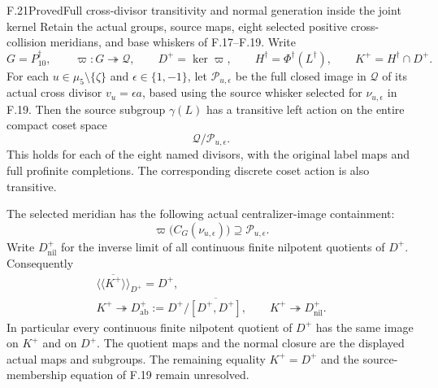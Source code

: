 \begin{claim}{F.21}{Proved}{Full cross-divisor transitivity and normal generation inside the joint kernel}
Retain the actual groups, source maps, eight selected positive
cross-collision meridians, and base whiskers of F.17--F.19.
Write
\[
 G=P_{10}^{\dagger},\qquad
 \varpi:G\twoheadrightarrow\mathcal Q,
 \qquad D^+=\ker\varpi,\qquad
 H^\dagger=\Phi^\dagger(L^\dagger),\qquad
 K^+=H^\dagger\cap D^+ .
                                                               \tag{F.21.1}
\]
For each $u\in\mu _5\setminus\{\zeta\}$ and
$\epsilon\in\{1,-1\}$, let $\mathcal P_{u,\epsilon}$
be the full closed image in $\mathcal Q$ of its actual
cross divisor $v_u=\epsilon a$, based using the source
whisker selected for $\nu_{u,\epsilon}$ in F.19.
Then the source subgroup $\gamma(L)$ has a transitive
left action on the entire compact coset space
\[
                 \mathcal Q/\mathcal P_{u,\epsilon}.
                                                               \tag{F.21.2}
\]
This holds for each of the eight named divisors, with
the original label maps and full profinite completions.
The corresponding discrete coset action is also transitive.

The selected meridian has the following actual
centralizer-image containment:
\[
 \varpi\bigl(C_G(\nu_{u,\epsilon})\bigr)
       \supseteq\mathcal P_{u,\epsilon}.
                                                               \tag{F.21.3}
\]
Write $D^+_{\mathrm{nil}}$ for the inverse limit of all
continuous finite nilpotent quotients of $D^+$.
Consequently
\[
 \begin{gathered}
 \overline{\langle\!\langle K^+\rangle\!\rangle}_{D^+}=D^+,\\
 K^+\twoheadrightarrow
       D^+_{\mathrm{ab}}
       :=D^+/\overline{[D^+,D^+]},\qquad
 K^+\twoheadrightarrow D^+_{\mathrm{nil}} .
 \end{gathered}
                                                               \tag{F.21.4}
\]
In particular every continuous finite nilpotent quotient of
$D^+$ has the same image on $K^+$ and on $D^+$.
The quotient maps and the normal closure are the displayed
actual maps and subgroups.
The remaining equality $K^+=D^+$ and the source-membership
equation of F.19 remain unresolved.
\end{claim}

